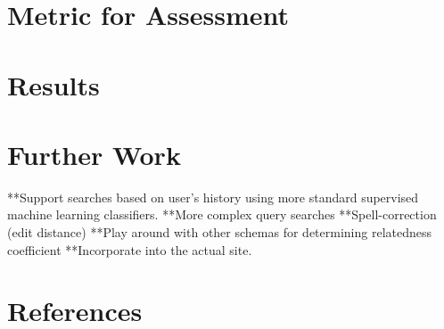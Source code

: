 \documentclass[12pt]{article}
\begin{document}
\section*{Metric for Assessment}

\section*{Results}
	
\section*{Further Work}
**Support searches based on user's history using more standard supervised machine learning classifiers.
	**More complex query searches
	**Spell-correction (edit distance)
	**Play around with other schemas for determining relatedness coefficient
	**Incorporate into the actual site.
\section*{References}
\end{document}
